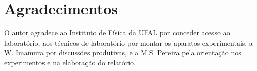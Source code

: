 \section*{Agradecimentos}

O autor agradece ao Instituto de Física da UFAL por conceder acesso ao laboratório, aos técnicos de laboratório por montar os aparatos experimentais, a W. Imamura por discussões produtivas, e a M.S. Pereira pela orientação nos experimentos e na elaboração do relatório.
